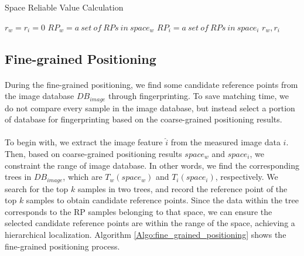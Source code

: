 \documentclass[a4paper,12pt]{report}
\begin{document}
\begin{algorithm}[H]
    \SetAlgoLined
    \DontPrintSemicolon
    \caption{Space Reliable Value Calculation}
    \label{Algo:CV}
    \BlankLine
    \BlankLine
    $r_w=r_i=0$ 
    $RP_w=a\ set\ of\ RPs\ in\ space_w$ \;
    $RP_i=a\ set\ of\ RPs\ in\ space_i$ \;
    \Return $r_w,r_i$
\end{algorithm}


\subsection{Fine-grained Positioning}
\paragraph{}
During the fine-grained positioning, we find some candidate reference points from the image database $DB_{image}$ through fingerprinting. To save matching time, we do not compare every sample in the image database, but instead select a portion of  database for fingerprinting based on the coarse-grained positioning results.
\paragraph{}
To begin with, we extract the image feature $\hat{i}$ from the measured image data $i$. Then, based on coarse-grained positioning results $space_w$ and $space_i$, we constraint the range of image database. In other words, we find the corresponding trees in $DB_{image}$, which are $T_w(space_w)$ and $T_i(space_i)$, respectively. We search for the top $k$ samples in two trees, and record the reference point of the top $k$ samples to obtain candidate reference points. Since the data within the tree corresponds to the RP samples belonging to that space, we can ensure the selected candidate reference points are within the range of the space, achieving a hierarchical localization. Algorithm \ref{Algo:fine_grained_positioning} shows the fine-grained positioning process.
\end{document}
